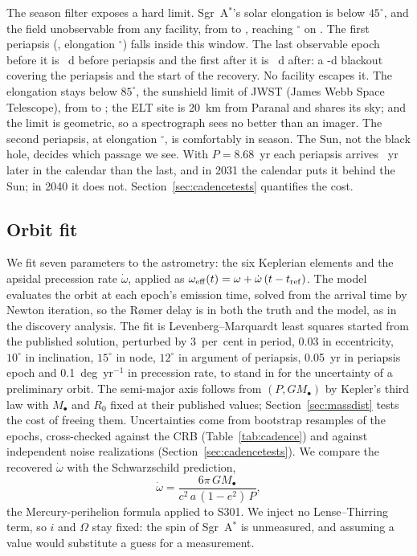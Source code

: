 \documentclass{aastex701}
\begin{document}
The season filter exposes a hard limit. Sgr~A$^*$'s solar elongation is below $45^\circ$, and the field unobservable from any facility, from \conjunctionElongBelowFourFiveStart{} to \conjunctionElongBelowFourFiveEnd{}, reaching \conjunctionElongMinDeg{}$^\circ$ on \conjunctionElongMinDate{}. The first periapsis (\conjunctionPeriOneDate{}, elongation \conjunctionPeriOneElongDeg{}$^\circ$) falls inside this window. The last observable epoch before it is \conjunctionGapDaysBeforePeri{}~d before periapsis and the first after it is \conjunctionGapDaysAfterPeri{}~d after: a \conjunctionGapTotalDays{}-d blackout covering the periapsis and the start of the recovery. No facility escapes it. The elongation stays below $85^\circ$, the sunshield limit of JWST (James Webb Space Telescope), from \conjunctionElongBelowEightFiveStart{} to \conjunctionElongBelowEightFiveEnd{}; the ELT site is 20~km from Paranal and shares its sky; and the limit is geometric, so a spectrograph sees no better than an imager. The second periapsis, at elongation \conjunctionPeriTwoElongDeg{}$^\circ$, is comfortably in season. The Sun, not the black hole, decides which passage we see. With $P = 8.68$~yr each periapsis arrives \conjunctionCalendarDriftYr{}~yr later in the calendar than the last, and in 2031 the calendar puts it behind the Sun; in 2040 it does not. Section~\ref{sec:cadencetests} quantifies the cost.

\subsection{Orbit fit}
\label{sec:fit}

We fit seven parameters to the astrometry: the six Keplerian elements and the apsidal precession rate $\dot\omega$, applied as $\omega_{\rm eff}(t) = \omega + \dot\omega\,(t - t_{\rm ref})$. The model evaluates the orbit at each epoch's emission time, solved from the arrival time by Newton iteration, so the R{\o}mer delay is in both the truth and the model, as in the discovery analysis. The fit is Levenberg--Marquardt least squares started from the published solution, perturbed by 3~per~cent in period, 0.03 in eccentricity, $10^\circ$ in inclination, $15^\circ$ in node, $12^\circ$ in argument of periapsis, 0.05~yr in periapsis epoch and 0.1~deg~yr$^{-1}$ in precession rate, to stand in for the uncertainty of a preliminary orbit. The semi-major axis follows from $(P, GM_\bullet)$ by Kepler's third law with $M_\bullet$ and $R_0$ fixed at their published values; Section~\ref{sec:massdist} tests the cost of freeing them. Uncertainties come from \fitNBootstrap{} bootstrap resamples of the epochs, cross-checked against the CRB (Table~\ref{tab:cadence}) and against \cadenceMcNRealizations{} independent noise realizations (Section~\ref{sec:cadencetests}). We compare the recovered $\dot\omega$ with the Schwarzschild prediction,
\begin{equation}
\dot\omega = \frac{6\pi\,GM_\bullet}{c^2\,a\,(1-e^2)\,P},
\label{eq:precession}
\end{equation}
the Mercury-perihelion formula applied to S301. We inject no Lense--Thirring term, so $i$ and $\Omega$ stay fixed: the spin of Sgr~A$^*$ is unmeasured, and assuming a value would substitute a guess for a measurement.
\end{document}
